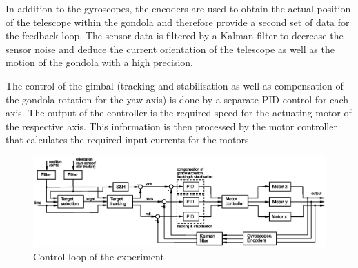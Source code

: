 In addition to the gyroscopes, the encoders are used to obtain the actual position of the telescope within the gondola and therefore provide a second set of data for the feedback loop. The sensor data is filtered by a Kalman filter to decrease the sensor noise and deduce the current orientation of the telescope as well as the motion of the gondola with a high precision.

The control of the gimbal (tracking and stabilisation as well as compensation of the gondola rotation for the yaw axis) is done by a separate PID control for each axis. The output of the controller is the required speed for the actuating motor of the respective axis. This information is then processed by the motor controller that calculates the required input currents for the motors. 



\newpage
\begin{landscape}
	\begin{figure}
		\includegraphics[width=\linewidth]{4-experiment-design/img/software/Control_loop.eps}
		\caption{Control loop of the experiment}
		\label{fig::software::control_loop}
	\end{figure}
\end{landscape}


\raggedbottom
